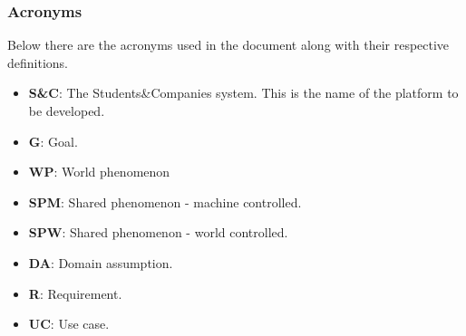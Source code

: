 \subsubsection{Acronyms}
Below there are the acronyms used in the document along with their respective definitions.
\begin{itemize}
    \item \textbf{S\&C}: The Students\&Companies system. This is the name of the platform to be developed.
    \item \textbf{G}: Goal. 
    \item \textbf{WP}: World phenomenon
    \item \textbf{SPM}: Shared phenomenon - machine controlled.
    \item \textbf{SPW}: Shared phenomenon - world controlled.
    \item \textbf{DA}: Domain assumption. 
    \item \textbf{R}: Requirement.
    \item \textbf{UC}: Use case.
\end{itemize}
